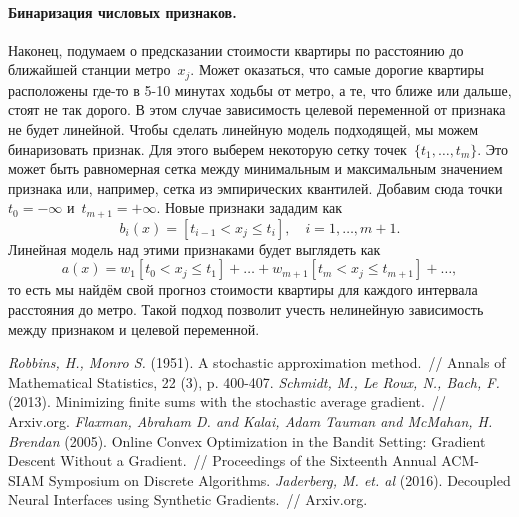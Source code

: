 \documentclass[12pt,fleqn]{article}
\begin{document}
\paragraph{Бинаризация числовых признаков.}

Наконец, подумаем о предсказании стоимости квартиры по расстоянию до ближайшей станции метро~$x_j$.
Может оказаться, что самые дорогие квартиры расположены где-то в 5-10 минутах ходьбы от метро,
а те, что ближе или дальше, стоят не так дорого.
В этом случае зависимость целевой переменной от признака не будет линейной.
Чтобы сделать линейную модель подходящей, мы можем бинаризовать признак.
Для этого выберем некоторую сетку точек~$\{t_1, \dots, t_m\}$.
Это может быть равномерная сетка между минимальным и максимальным значением признака или,
например, сетка из эмпирических квантилей.
Добавим сюда точки~$t_0 = -\infty$ и~$t_{m+1} = +\infty$.
Новые признаки зададим как
\[
b_i(x)
=
[t_{i - 1} < x_j \leq t_{i}],
\quad
i = 1, \dots, m+1.
\]
Линейная модель над этими признаками будет выглядеть как
\[
a(x)
=
w_1 [t_{0} < x_j \leq t_{1}]
+
\dots
+
w_{m+1} [t_{m} < x_j \leq t_{m+1}]
+
\dots,
\]
то есть мы найдём свой прогноз стоимости квартиры для каждого интервала расстояния до метро.
Такой подход позволит учесть нелинейную зависимость между признаком и целевой переменной.


\begin{thebibliography}{1}
    \emph{Robbins, H., Monro S.} (1951).
    A stochastic approximation method.~//
    Annals of Mathematical Statistics,
    22 (3), p. 400-407.
    \emph{Schmidt, M., Le Roux, N., Bach, F. } (2013).
    Minimizing finite sums with the stochastic average gradient.~//
    Arxiv.org.
    \emph{Flaxman, Abraham D. and Kalai, Adam Tauman and McMahan, H. Brendan} (2005).
    Online Convex Optimization in the Bandit Setting: Gradient Descent Without a Gradient.~//
    Proceedings of the Sixteenth Annual ACM-SIAM Symposium on Discrete Algorithms.
    \emph{Jaderberg, M. et. al} (2016).
    Decoupled Neural Interfaces using Synthetic Gradients.~//
    Arxiv.org.
\end{thebibliography}
\end{document}
